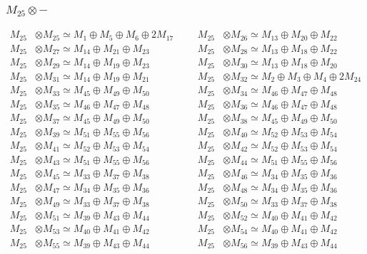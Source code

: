 \subsubsection{$ M_{25}\otimes -$}
\begin{align*}
M_{25} &\otimes M_{25} \simeq M_{1} \oplus M_{5} \oplus M_{6} \oplus 2M_{17} &&& M_{25} &\otimes M_{26} \simeq M_{13} \oplus M_{20} \oplus M_{22}\\
M_{25} &\otimes M_{27} \simeq M_{14} \oplus M_{21} \oplus M_{23} &&& M_{25} &\otimes M_{28} \simeq M_{13} \oplus M_{18} \oplus M_{22}\\
M_{25} &\otimes M_{29} \simeq M_{14} \oplus M_{19} \oplus M_{23} &&& M_{25} &\otimes M_{30} \simeq M_{13} \oplus M_{18} \oplus M_{20}\\
M_{25} &\otimes M_{31} \simeq M_{14} \oplus M_{19} \oplus M_{21} &&& M_{25} &\otimes M_{32} \simeq M_{2} \oplus M_{3} \oplus M_{4} \oplus 2M_{24}\\
M_{25} &\otimes M_{33} \simeq M_{45} \oplus M_{49} \oplus M_{50} &&& M_{25} &\otimes M_{34} \simeq M_{46} \oplus M_{47} \oplus M_{48}\\
M_{25} &\otimes M_{35} \simeq M_{46} \oplus M_{47} \oplus M_{48} &&& M_{25} &\otimes M_{36} \simeq M_{46} \oplus M_{47} \oplus M_{48}\\
M_{25} &\otimes M_{37} \simeq M_{45} \oplus M_{49} \oplus M_{50} &&& M_{25} &\otimes M_{38} \simeq M_{45} \oplus M_{49} \oplus M_{50}\\
M_{25} &\otimes M_{39} \simeq M_{51} \oplus M_{55} \oplus M_{56} &&& M_{25} &\otimes M_{40} \simeq M_{52} \oplus M_{53} \oplus M_{54}\\
M_{25} &\otimes M_{41} \simeq M_{52} \oplus M_{53} \oplus M_{54} &&& M_{25} &\otimes M_{42} \simeq M_{52} \oplus M_{53} \oplus M_{54}\\
M_{25} &\otimes M_{43} \simeq M_{51} \oplus M_{55} \oplus M_{56} &&& M_{25} &\otimes M_{44} \simeq M_{51} \oplus M_{55} \oplus M_{56}\\
M_{25} &\otimes M_{45} \simeq M_{33} \oplus M_{37} \oplus M_{38} &&& M_{25} &\otimes M_{46} \simeq M_{34} \oplus M_{35} \oplus M_{36}\\
M_{25} &\otimes M_{47} \simeq M_{34} \oplus M_{35} \oplus M_{36} &&& M_{25} &\otimes M_{48} \simeq M_{34} \oplus M_{35} \oplus M_{36}\\
M_{25} &\otimes M_{49} \simeq M_{33} \oplus M_{37} \oplus M_{38} &&& M_{25} &\otimes M_{50} \simeq M_{33} \oplus M_{37} \oplus M_{38}\\
M_{25} &\otimes M_{51} \simeq M_{39} \oplus M_{43} \oplus M_{44} &&& M_{25} &\otimes M_{52} \simeq M_{40} \oplus M_{41} \oplus M_{42}\\
M_{25} &\otimes M_{53} \simeq M_{40} \oplus M_{41} \oplus M_{42} &&& M_{25} &\otimes M_{54} \simeq M_{40} \oplus M_{41} \oplus M_{42}\\
M_{25} &\otimes M_{55} \simeq M_{39} \oplus M_{43} \oplus M_{44} &&& M_{25} &\otimes M_{56} \simeq M_{39} \oplus M_{43} \oplus M_{44}\\
\end{align*}

